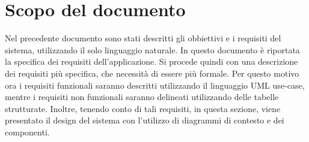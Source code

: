 \section*{Scopo del documento}
Nel precedente documento sono stati descritti gli obbiettivi e i requisiti del sistema, utilizzando il solo linguaggio naturale. In questo documento è riportata la specifica dei requisiti dell'applicazione. Si procede quindi con una descrizione dei requisiti più specifica, che necessità di essere più formale. Per questo motivo ora i requisiti funzionali saranno descritti utilizzando il linguaggio UML use-case, mentre i requisiti non funzionali saranno delineati utilizzando delle tabelle strutturate. Inoltre, tenendo conto di tali requisiti, in questa sezione, viene presentato il design del sistema con l’utilizzo di diagrammi di contesto e dei componenti.